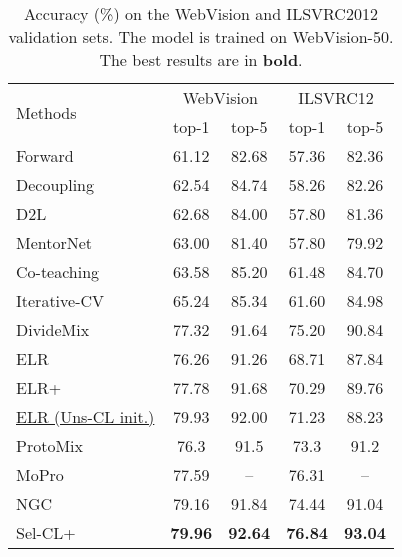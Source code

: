 \documentclass[10pt,twocolumn,letterpaper]{article}
\begin{document}
\begin{table}[h]		
	\caption{Accuracy (\%) on the WebVision and ILSVRC2012 validation sets. The model is trained on WebVision-50. The best results are in \textbf{bold}.}\vspace{-5pt}\centering
	\small
	\begin{tabular}{l|c|c|c|c}
		\hline \multirow{2}{*}{ Methods } & \multicolumn{2}{|c|}{ WebVision } & \multicolumn{2}{c}{ ILSVRC12 } \\
		\cline { 2 - 5 } & top-1 & top-5 & top-1 & top-5 \\
		\hline Forward~\cite{PatriniRMNQ17} &  61.12  &  82.68  &  57.36  &  82.36  \\
		Decoupling~\cite{malach2017decoupling} &  62.54  &  84.74  &  58.26  &  82.26  \\
		D2L~\cite{MaWHZEXWB18} &  62.68  &  84.00  &  57.80  &  81.36  \\
		MentorNet~\cite{Jiang2018icml} &  63.00  &  81.40  &  57.80  &  79.92  \\
		Co-teaching~\cite{Han2018NIPS} &  63.58  &  85.20  &  61.48  &  84.70  \\
		Iterative-CV~\cite{ChenLCZ19} &  65.24  &  85.34  &  61.60  &  84.98  \\
		DivideMix~\cite{LiSH20} &  77.32  &  91.64  & 75.20 &  90.84  \\
		ELR~\cite{LiuNRF20} &  76.26  &  91.26  &  68.71  &  87.84  \\
		ELR+~\cite{LiuNRF20} &  77.78  &  91.68  &  70.29  &  89.76  \\
		\hline 
		\underline{ELR (Uns-CL init.)} & 79.93 & 92.00 & 71.23 & 88.23\\
		ProtoMix~\cite{li2020learning} & 76.3  & 91.5  & 73.3  & 91.2 \\
		MoPro~\cite{Li2021ICLR}  & 77.59 & -- & 76.31 & -- \\
		NGC~\cite{Zhi2021ICCV}   & 79.16 & 91.84 & 74.44 & 91.04 \\
		Sel-CL+ & \textbf{79.96} & \textbf{92.64} & \textbf{76.84} & \textbf{93.04} 
		\\
		\hline
	\end{tabular}
    \label{webvision}
\end{table}
	
\end{document}
